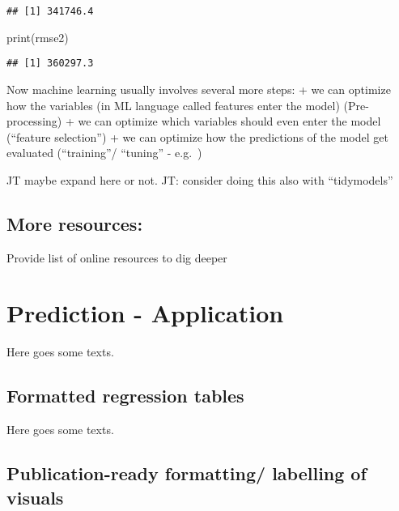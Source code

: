 \documentclass[
]{book}
\newenvironment{Shaded}{\begin{snugshade}}{\end{snugshade}}
\newcommand{\FunctionTok}[1]{\textcolor[rgb]{0.00,0.00,0.00}{#1}}
\newcommand{\NormalTok}[1]{#1}
\begin{document}
\begin{verbatim}
## [1] 341746.4
\end{verbatim}

\begin{Shaded}
\begin{Highlighting}[]
\FunctionTok{print}\NormalTok{(rmse2)}
\end{Highlighting}
\end{Shaded}

\begin{verbatim}
## [1] 360297.3
\end{verbatim}

Now machine learning usually involves several more steps:
+ we can optimize how the variables (in ML language called features enter the model) (Pre-processing)
+ we can optimize which variables should even enter the model (``feature selection'')
+ we can optimize how the predictions of the model get evaluated (``training''/ ``tuning'' - e.g.~)

JT maybe expand here or not.
JT: consider doing this also with ``tidymodels''

\hypertarget{more-resources}{%
\section{More resources:}\label{more-resources}}

Provide list of online resources to dig deeper

\hypertarget{pm-a}{%
\chapter{Prediction - Application}\label{pm-a}}

Here goes some texts.

\hypertarget{formatted-regression-tables}{%
\section{Formatted regression tables}\label{formatted-regression-tables}}

Here goes some texts.

\hypertarget{publication-ready-formatting-labelling-of-visuals}{%
\section{Publication-ready formatting/ labelling of visuals}\label{publication-ready-formatting-labelling-of-visuals}}
\end{document}
